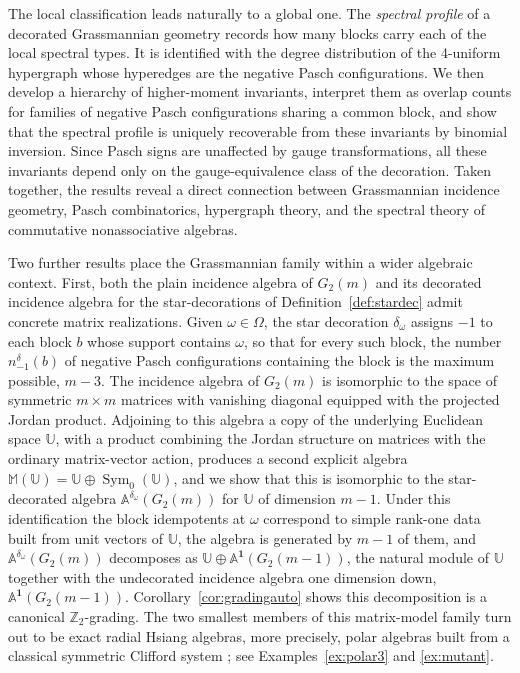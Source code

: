 \documentclass[times,11pt,reqno]{amsproc}
\theoremstyle{definition}
\numberwithin{equation}{section}
\def\alg{\mathbb{A}}
\def\ualg{\mathbb{U}}
\DeclareMathOperator{\Sym}{Sym}
\def\ualg{\mathbb{U}}
\def\malg{\mathbb{M}}
\newcommand{\vm}[1]{\malg(#1)}
\begin{document}
The local classification leads naturally to a global one. The \emph{spectral profile} of a decorated Grassmannian geometry records how many blocks carry each of the local spectral types. It is identified with the degree distribution of the $4$-uniform hypergraph whose hyperedges are the negative Pasch configurations. We then develop a hierarchy of higher-moment invariants, interpret them as overlap counts for families of negative Pasch configurations sharing a common block, and show that the spectral profile is uniquely recoverable from these invariants by binomial inversion. Since Pasch signs are unaffected by gauge transformations, all these invariants depend only on the gauge-equivalence class of the decoration. Taken together, the results reveal a direct connection between Grassmannian incidence geometry, Pasch combinatorics, hypergraph theory, and the spectral theory of commutative nonassociative algebras.

Two further results place the Grassmannian family within a wider algebraic
context. First, both the plain incidence algebra of $G_2(m)$ and its decorated incidence algebra for the star-decorations of Definition~\ref{def:stardec} admit
concrete matrix realizations. Given $\omega \in \Omega$, the star decoration $\delta_{\omega}$ assigns $-1$ to each block $b$ whose support contains $\omega$, so that for every such block, the number $n_{-1}^{\delta}(b)$ of negative Pasch configurations containing the block is the maximum possible, $m-3$.
The incidence algebra of $G_2(m)$ is
isomorphic to the space of symmetric $m\times m$ matrices with vanishing diagonal
equipped with the projected Jordan product.
Adjoining to this algebra a copy of the underlying Euclidean space $\ualg$, with a product
combining the Jordan structure on matrices with the ordinary
matrix-vector action, produces a second explicit algebra
$\vm{\ualg}=\ualg\oplus\Sym_0(\ualg)$, and we show that this
is isomorphic to the star-decorated algebra
$\alg^{\delta_\omega}(G_2(m))$ for $\ualg$ of dimension $m-1$.
Under this
identification the block idempotents at $\omega$ correspond to simple
rank-one data built from unit vectors of $\ualg$, the algebra is
generated by $m-1$ of them, and $\alg^{\delta_\omega}(G_2(m))$
decomposes as $\ualg\oplus\alg^{\mathbf1}(G_2(m-1))$, the natural module
of $\ualg$ together with the undecorated incidence algebra one dimension down, $\alg^{\mathbf1}(G_2(m-1))$.
Corollary~\ref{cor:gradingauto} shows this decomposition is a canonical $\mathbb Z_2$-grading. The two smallest members of this matrix-model family turn out to be exact
radial Hsiang algebras, more precisely, polar algebras built from a classical symmetric Clifford system \cite{Ferus-Karcher-Munzner, Tkachev-cliff}; see Examples~\ref{ex:polar3} and \ref{ex:mutant}.
\end{document}
